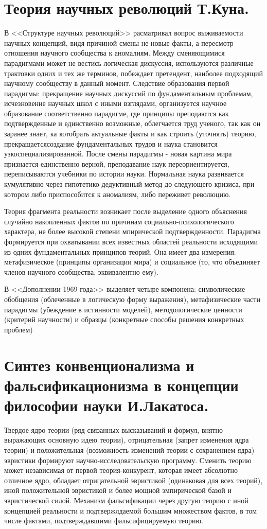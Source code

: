 \documentclass[12pt, specialist, subf, substylefile = spbu.rtx]{disser}
\begin{document}
\section{Теория научных революций Т.Куна.}
В <<Структуре научных революций>> расматривал вопрос выживаемости научных концепций, видя причиной смены не новые факты, а пересмотр отношения научного сообщества к аномалиям. Между сменяющимися парадигмами может не вестись логическая дискуссия, используются различные трактовки одних и тех же терминов, побеждает претендент, наиболее подходящий научному сообществу в данный момент. 
Следствие образования первой парадигмы: прекращение научных дискуссий по фундаментальным проблемам, исчезновение научных школ с иными взглядами, организуется научное образование соответственно парадигме, где принципы преподаются как подтвержденные и единственно возможные, облегчается труд ученого, так как он заранее знает, ка котобрать актуальные факты и как строить (уточнять) теорию, прекращаетсясоздание фундаментальных трудов и наука становится узкоспециализированной.
После смены парадигмы - новая картина мира признается единственно верной, преподавание наук переориентируется, переписываются учебники по истории науки.
Нормальная наука развивается кумулятивно через гипотетико-дедуктивный метод до следующего кризиса, при котором либо приспособится к аномалиям, либо переживет революцию.

Теория фрагмента реальности возникает после выделение одного объяснения случайно накопленных фактов по причинам социально-психологического характера, не более высокой степени мпирической подтвержденности. Парадигма формируется при охватывании всех известных областей реальности исходящими из одних фундаментальных принципов теорий. Она имеет два измерения: метафизическое (принципы организации мира) и социальное (то, что объединяет членов научного сообщества, эквивалентно ему). 

В <<Дополнении 1969 года>> выделяет четыре компонена: символические обобщения (облеченные в логическую форму выражения), метафизические части парадигмы (убеждение в истинности моделей), методологические ценности (критерий научности) и образцы (конкретные способы решения конкретных проблем)



\section{Синтез конвенционализма и фальсификационизма в концепции философии науки И.Лакатоса.}
Твердое ядро теории (ряд связанных высказываний и формул, внятно выражающих основную идею теории), отрицательная (запрет изменения ядра теории) и положительная (возможность изменений теории с сохранением ядра) эвристики формируют научно-исследовательскую программу.
Сменить теорию может независимая от первой теория-конкурент, которая имеет абсолютно отличное ядро, обладает отрицательной эвристикой (одинаковая для всех теорий), иной положительной эвристикой и более мощной эмпирической базой и эвристической силой.
Механизм фальсификации через другую теорию с иной концепцией реальности и подтвержлдаемой большим множеством фактов, в том числе фактами, подтверждавшими фальсифицируемую теорию.
\end{document}
